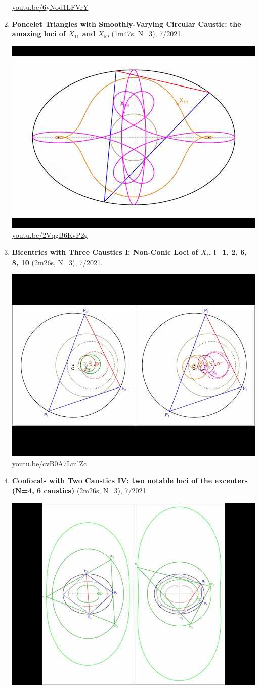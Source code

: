 \documentclass[12pt]{amsart}
\begin{document}
\begin{enumerate}[resume]
\begin{center}
\href{https://youtu.be/6yNod1LFVrY}{\url{youtu.be/6yNod1LFVrY}}\end{center}
% 
\item \textbf{Poncelet Triangles with Smoothly-Varying Circular Caustic: the amazing loci of $X_{11}$ and $X_{59}$} (1m47s, N=3), 7/2021. 
\begin{center}\includegraphics[width=.5\textwidth]{pics/2VqgB6KvP2g.jpg} \\ 
\href{https://youtu.be/2VqgB6KvP2g}{\url{youtu.be/2VqgB6KvP2g}}\end{center}
% 
\item \textbf{Bicentrics with Three Caustics I: Non-Conic Loci of $X_i$, i=1, 2, 6, 8, 10} (2m26s, N=3), 7/2021. 
\begin{center}\includegraphics[width=.5\textwidth]{pics/cvB0A7LmlZc.jpg} \\ 
\href{https://youtu.be/cvB0A7LmlZc}{\url{youtu.be/cvB0A7LmlZc}}\end{center}
% 
\item \textbf{Confocals with Two Caustics IV: two notable loci of the excenters (N=4, 6 caustics)} (2m26s, N=3), 7/2021. 
\begin{center}\includegraphics[width=.5\textwidth]{pics/wB9bVkY9rqU.jpg} \\ 

\end{center}
\end{enumerate}
\end{document}
